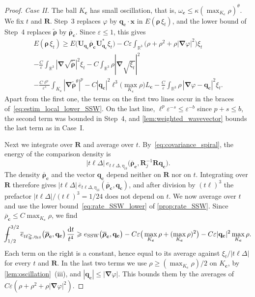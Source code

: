 \documentclass[final,reqno]{amsart}
\theoremstyle{remark}
\renewcommand{\le}{\leqslant}
\renewcommand{\ge}{\geqslant}
\renewcommand{\epsilon}{\varepsilon}
\newcommand{\ol}[1]{\overline{#1}}
\newcommand{\wt}[1]{\widetilde{#1}}
\newcommand{\RR}{\mathbb{R}}
\newcommand{\SSW}{\mathrm{SSW}}
\newcommand{\grad}{\bm{\nabla}}
\newcommand{\tetra}{\mathbb{\Delta}}
\newcommand{\dd}{\mathrm{d}}
\def\Xint#1{\mathchoice
{\XXint\displaystyle\textstyle{#1}}
{\XXint\textstyle\scriptstyle{#1}}
{\XXint\scriptstyle\scriptscriptstyle{#1}}
{\XXint\scriptscriptstyle\scriptscriptstyle{#1}}
\!\int}
\def\XXint#1#2#3{{\setbox0=\hbox{$#1{#2#3}{\int}$ }
\vcenter{\hbox{$#2#3$ }}\kern-.6\wd0}}
\def\dashint{\Xint-}
\begin{document}
\begin{proof}
\noindent\emph{Case II.} The ball $K_{\mathbf{c}}$ has small oscillation, that is, $\omega_{\mathbf{c}}\le\kappa(\max_{K_{\mathbf{c}}}\rho)^\theta$. We fix $t$ and $\mathbf{R}$. Step~3 replaces $\varphi$ by $\mathbf{q}_{\mathbf{c}}\cdot\mathbf{x}$ in $E(\bm{\rho}\,\xi_t)$, and the lower bound of Step~4 replaces $\wt{\bm{\rho}}$ by $\ol{\bm{\rho}}_{\mathbf{c}}$. Since $\epsilon\le1$, this gives
\begin{multline*}
E(\bm{\rho}\,\xi_t)\ge E\big(\mathbf{U}_{\mathbf{q}_{\mathbf{c}}}\ol{\bm{\rho}}_{\mathbf{c}}\mathbf{U}_{\mathbf{q}_{\mathbf{c}}}^*\xi_t\big)-C\epsilon\int_{\RR^3}\big(\rho+\rho^2+\rho|\grad\varphi|^2\big)\xi_t\\
-\frac C\epsilon\int_{\RR^3}|\grad\sqrt{\wt{\bm{\rho}}}|^2\xi_t-C\int_{\RR^3}\rho|\grad\sqrt{\xi_t}|^2\\
-\frac{C\ell^p}{\epsilon^s}\int_{K_{\mathbf{c}}}|\grad\wt{\bm{\rho}}^\theta|^p-C|\mathbf{q}_{\mathbf{c}}|^2\ell^3\Big(\max_{K_{\mathbf{c}}}\rho\Big)L_{\mathbf{c}}-\frac C\epsilon\int_{\RR^3}\rho\,|\grad\varphi-\mathbf{q}_{\mathbf{c}}|^2\xi_t.
\end{multline*}
Apart from the first one, the terms on the first two lines occur in the braces of~\cref{eq:estim_local_lower_SSW}. On the last line, $\ell^p\epsilon^{-s}\le\epsilon^{-b}$ since $p+s\le b$, the second term was bounded in Step~4, and \cref{lem:weighted_wavevector} bounds the last term as in Case~I.

Next we integrate over $\mathbf{R}$ and average over $t$. By~\cref{eq:covariance_spiral}, the energy of the comparison density is
$$
|t\ell\tetra|\,e_{t\ell\tetra,\eta_{t\delta}}\big(\ol{\bm{\rho}}_{\mathbf{c}},\mathbf{R}_j^{-1}\mathbf{R}\mathbf{q}_{\mathbf{c}}\big).
$$
The density $\ol{\bm{\rho}}_{\mathbf{c}}$ and the vector $\mathbf{q}_{\mathbf{c}}$ depend neither on $\mathbf{R}$ nor on $t$. Integrating over $\mathbf{R}$ therefore gives $|t\ell\tetra|\,\ol{e}_{t\ell\tetra,\eta_{t\delta}}(\ol{\bm{\rho}}_{\mathbf{c}},\mathbf{q}_{\mathbf{c}})$, and after division by $(t\ell)^3$ the prefactor $|t\ell\tetra|/(t\ell)^3=1/24$ does not depend on $t$. We now average over $t$ and use the lower bound~\cref{eq:rate_SSW_lower} of \cref{prop:rate_SSW}. Since $\ol{\rho}_{\mathbf{c}}\le C\max_{K_{\mathbf{c}}}\rho$, we find
$$
\dashint_{1/2}^{3/2}\ol{e}_{t\ell\tetra,\eta_{t\delta}}\big(\ol{\bm{\rho}}_{\mathbf{c}},\mathbf{q}_{\mathbf{c}}\big)\,\frac{\dd t}{t^4}
\ge e_\SSW\big(\ol{\bm{\rho}}_{\mathbf{c}},\mathbf{q}_{\mathbf{c}}\big)-C\epsilon\big(\max_{K_{\mathbf{c}}}\rho+(\max_{K_{\mathbf{c}}}\rho)^2\big)-C\epsilon|\mathbf{q}_{\mathbf{c}}|^2\max_{K_{\mathbf{c}}}\rho.
$$
Each term on the right is a constant, hence equal to its average against $\xi_t/|t\ell\tetra|$ for every $t$ and $\mathbf{R}$. In the last two terms we use $\rho\ge(\max_{K_{\mathbf{c}}}\rho)/2$ on $K_{\mathbf{c}}$, by \cref{lem:oscillation}~(iii), and $|\mathbf{q}_{\mathbf{c}}|\le|\grad\varphi|$. This bounds them by the averages of $C\epsilon(\rho+\rho^2+\rho|\grad\varphi|^2)$.


\end{proof}
\end{document}
